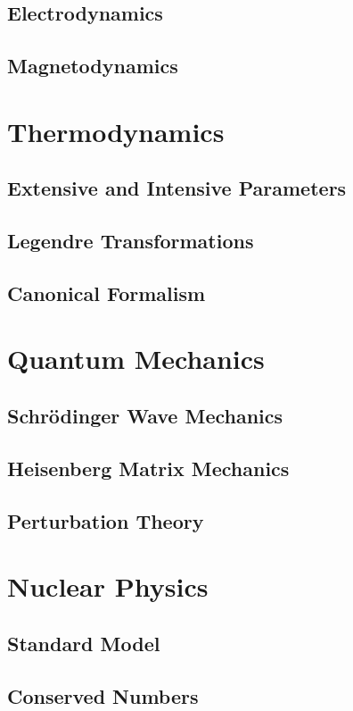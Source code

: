 \documentclass[oneside]{book}
\numberwithin{figure}{section}
\numberwithin{equation}{section}
\theoremstyle{definition}
\begin{document}
	\section{Electrodynamics}
	\section{Magnetodynamics}

	\chapter{Thermodynamics}
	\section{Extensive and Intensive Parameters}
	\section{Legendre Transformations}
	\section{Canonical Formalism}

	\chapter{Quantum Mechanics}
	\section{Schrödinger Wave Mechanics}
	\section{Heisenberg Matrix Mechanics}
	\section{Perturbation Theory}

	\chapter{Nuclear Physics}
	\section{Standard Model}
	\section{Conserved Numbers}
\end{document}
